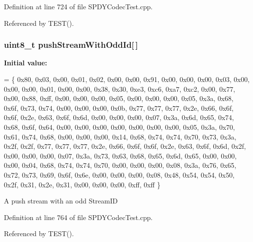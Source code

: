 Definition at line 724 of file S\+P\+D\+Y\+Codec\+Test.\+cpp.



Referenced by T\+E\+S\+T().

\subsubsection[{push\+Stream\+With\+Odd\+Id}]{\setlength{\rightskip}{0pt plus 5cm}uint8\+\_\+t push\+Stream\+With\+Odd\+Id[$\,$]}\label{SPDYCodecTest_8cpp_a24f70503a4a54bf2a393338b6ba5cbeb}
{\bfseries Initial value\+:}
\begin{DoxyCode}
=
\{ 0x80, 0x03, 0x00, 0x01, 0x02, 0x00, 0x00, 0x91,
  0x00, 0x00, 0x00, 0x03, 0x00, 0x00, 0x00, 0x01,
  0x00, 0x00, 0x38, 0x30, 0xe3, 0xc6, 0xa7, 0xc2,
  0x00, 0x77, 0x00, 0x88, 0xff, 0x00, 0x00, 0x00,
  0x05, 0x00, 0x00, 0x00, 0x05, 0x3a, 0x68, 0x6f,
  0x73, 0x74, 0x00, 0x00, 0x00, 0x0b, 0x77, 0x77,
  0x77, 0x2e, 0x66, 0x6f, 0x6f, 0x2e, 0x63, 0x6f,
  0x6d, 0x00, 0x00, 0x00, 0x07, 0x3a, 0x6d, 0x65,
  0x74, 0x68, 0x6f, 0x64, 0x00, 0x00, 0x00, 0x00,
  0x00, 0x00, 0x00, 0x05, 0x3a, 0x70, 0x61, 0x74,
  0x68, 0x00, 0x00, 0x00, 0x14, 0x68, 0x74, 0x74,
  0x70, 0x73, 0x3a, 0x2f, 0x2f, 0x77, 0x77, 0x77,
  0x2e, 0x66, 0x6f, 0x6f, 0x2e, 0x63, 0x6f, 0x6d,
  0x2f, 0x00, 0x00, 0x00, 0x07, 0x3a, 0x73, 0x63,
  0x68, 0x65, 0x6d, 0x65, 0x00, 0x00, 0x00, 0x04,
  0x68, 0x74, 0x74, 0x70, 0x00, 0x00, 0x00, 0x08,
  0x3a, 0x76, 0x65, 0x72, 0x73, 0x69, 0x6f, 0x6e,
  0x00, 0x00, 0x00, 0x08, 0x48, 0x54, 0x54, 0x50,
  0x2f, 0x31, 0x2e, 0x31, 0x00, 0x00, 0x00, 0xff,
  0xff
\}
\end{DoxyCode}
A push stream with an odd Stream\+ID 

Definition at line 764 of file S\+P\+D\+Y\+Codec\+Test.\+cpp.



Referenced by T\+E\+S\+T().

